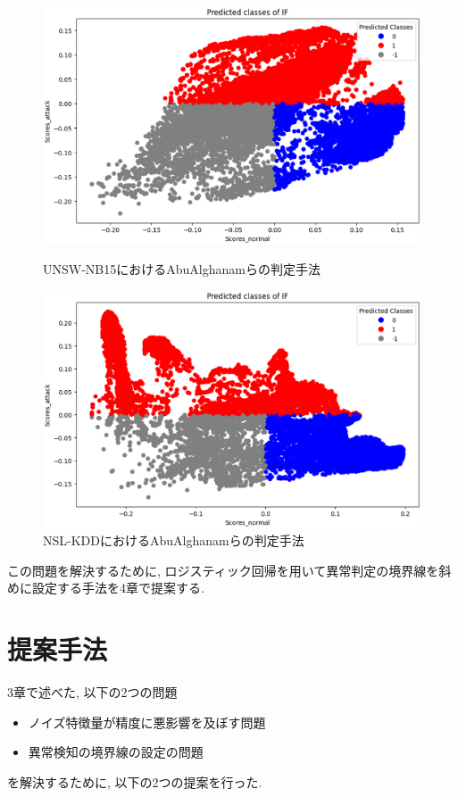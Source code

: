 \documentclass{css}
\begin{document}
\begin{figure}[ht]
    \centering
    \begin{minipage}{0.9\linewidth}
        \centering
        \includegraphics[width=\linewidth]{pictures/eps/UNSW-NB152.eps}
        \caption{UNSW-NB15におけるAbuAlghanamらの判定手法}
        \label{fig:UNSW-NB152}
    \end{minipage}
    \vfill{} 
    \begin{minipage}{0.9\linewidth}
        \centering
        \includegraphics[width=\linewidth]{pictures/eps/NSL-KDD2.eps}
        \caption{NSL-KDDにおけるAbuAlghanamらの判定手法}
        \label{fig:NSL-KDD2}
    \end{minipage}
\end{figure}

この問題を解決するために, ロジスティック回帰を用いて異常判定の境界線を斜めに設定する手法を4章で提案する. 

\section{提案手法}
3章で述べた, 以下の2つの問題
\begin{itemize}
    \item ノイズ特徴量が精度に悪影響を及ぼす問題
    \item 異常検知の境界線の設定の問題
\end{itemize}
を解決するために, 以下の2つの提案を行った. 
\end{document}

